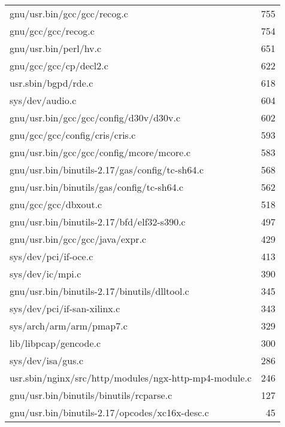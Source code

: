 \begin{tabular}{l r}
{gnu/usr.bin/gcc/gcc/recog.c} & 755 \\
{gnu/gcc/gcc/recog.c} & 754 \\
{gnu/usr.bin/perl/hv.c} & 651 \\
{gnu/gcc/gcc/cp/decl2.c} & 622 \\
{usr.sbin/bgpd/rde.c} & 618 \\
{sys/dev/audio.c} & 604 \\
{gnu/usr.bin/gcc/gcc/config/d30v/d30v.c} & 602 \\
{gnu/gcc/gcc/config/cris/cris.c} & 593 \\
{gnu/usr.bin/gcc/gcc/config/mcore/mcore.c} & 583 \\
{gnu/usr.bin/binutils-2.17/gas/config/tc-sh64.c} & 568 \\
{gnu/usr.bin/binutils/gas/config/tc-sh64.c} & 562 \\
{gnu/gcc/gcc/dbxout.c} & 518 \\
{gnu/usr.bin/binutils-2.17/bfd/elf32-s390.c} & 497 \\
{gnu/usr.bin/gcc/gcc/java/expr.c} & 429 \\
{sys/dev/pci/if-oce.c} & 413 \\
{sys/dev/ic/mpi.c} & 390 \\
{gnu/usr.bin/binutils-2.17/binutils/dlltool.c} & 345 \\
{sys/dev/pci/if-san-xilinx.c} & 343 \\
{sys/arch/arm/arm/pmap7.c} & 329 \\
{lib/libpcap/gencode.c} & 300 \\
{sys/dev/isa/gus.c} & 286 \\
{usr.sbin/nginx/src/http/modules/ngx-http-mp4-module.c} & 246 \\
{gnu/usr.bin/binutils/binutils/rcparse.c} & 127 \\
{gnu/usr.bin/binutils-2.17/opcodes/xc16x-desc.c} & 45 \\
\end{tabular}
